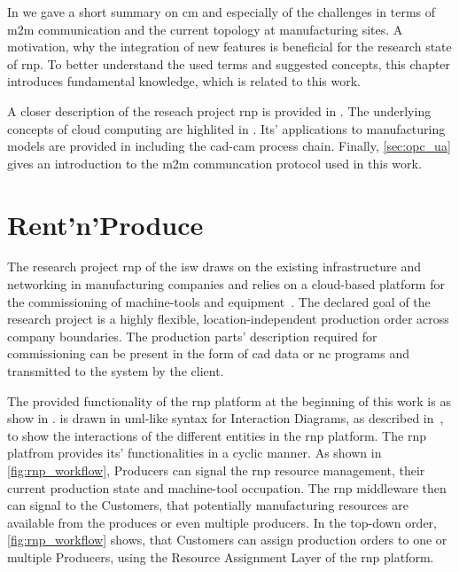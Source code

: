 \documentclass[
a4paper,
twoside,
headsepline,
cleardoublepage=empty,
parskip=half,
draft=false
]{scrbook}
\begin{document}
		In  we gave a short summary on \gls{cm} and especially of the challenges in terms of \gls{m2m} communication and the current topology at manufacturing sites.
		A motivation, why the integration of new features is beneficial for the research state of \gls{rnp}.
		To better understand the used terms and suggested concepts, this chapter introduces fundamental knowledge, which is related to this work.

		A closer description of the reseach project \gls{rnp} is provided in .
		The underlying concepts of cloud computing are highlited in .
		Its' applications to manufacturing models are provided in  including the \gls{cad}-\gls{cam} process chain.
		Finally, \cref{sec:opc_ua} gives an introduction to the \gls{m2m} communcation protocol used in this work.

		\section{Rent'n'Produce}\label{sec:rent_n_produce}

			The research project \gls{rnp} of the \gls{isw} draws on the existing infrastructure and networking in manufacturing companies and relies on a cloud-based platform for the commissioning of machine-tools and equipment~\cite{xen.17b}. The declared goal of the research project is a highly flexible, location-independent production order across company boundaries. The production parts' description required for commissioning can be present in the form of \gls{cad} data or \gls{nc} programs and transmitted to the system by the client.
			
			The provided functionality of the \gls{rnp} platform at the beginning of this work is as show in .  is drawn in \gls{uml}-like syntax for Interaction Diagrams, as described in~\cite{uml2017}, to show the interactions of the different entities in the \gls{rnp} platform. The \gls{rnp} platfrom provides its' functionalities in a cyclic manner. As shown in \cref{fig:rnp_workflow}, Producers can signal the \gls{rnp} resource management, their current production state and machine-tool occupation. The \gls{rnp} middleware then can signal to the Customers, that potentially manufacturing resources are available from the produces or even multiple producers. In the top-down order, \cref{fig:rnp_workflow} shows, that Customers can assign production orders to one or multiple Producers, using the Resource Assignment Layer of the \gls{rnp} platform.
\end{document}
